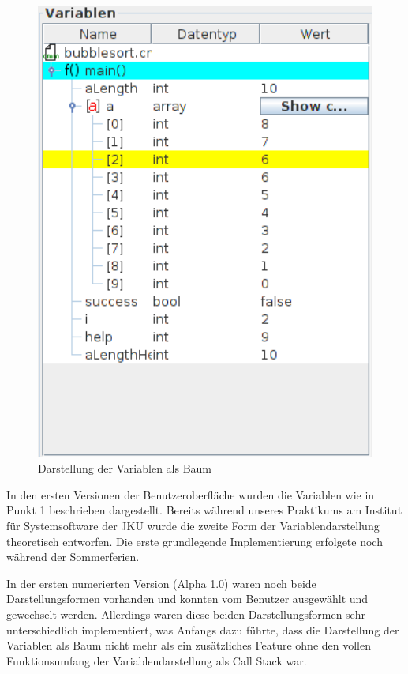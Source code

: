 \begin{figure}[h!]
\begin{minipage}{0.45\textwidth}
		\includegraphics[width=1.0\textwidth]{./media/images/gui/var/treetable2.png}
		\caption{Darstellung der Variablen als Baum}\label{fig:deb-var-m2}
	\end{minipage}
\end{figure}

In den ersten Versionen der Benutzeroberfläche wurden die Variablen wie in Punkt 1 beschrieben dargestellt. Bereits während unseres Praktikums am Institut für Systemsoftware der JKU wurde die zweite Form der Variablendarstellung theoretisch entworfen. Die erste grundlegende Implementierung erfolgete noch während der Sommerferien.

In der ersten numerierten Version (Alpha 1.0) waren noch beide Darstellungsformen vorhanden und konnten vom Benutzer ausgewählt und gewechselt werden. Allerdings waren diese beiden Darstellungsformen sehr unterschiedlich implementiert, was Anfangs dazu führte, dass die Darstellung der Variablen als Baum nicht mehr als ein zusätzliches Feature ohne den vollen Funktionsumfang der Variablendarstellung als Call Stack war.

